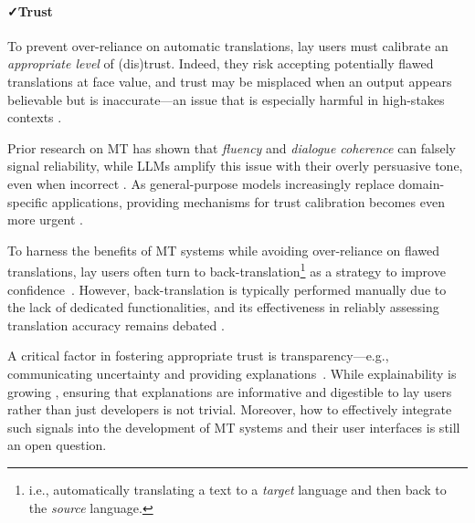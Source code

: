 \paragraph{\faCheck \space Trust} 
To prevent over-reliance on automatic translations, lay users must calibrate an \emph{appropriate level} of (dis)trust. Indeed, they risk accepting potentially flawed translations at face value, and trust may be misplaced when an output appears believable but is inaccurate—an issue that is especially harmful in high-stakes contexts \citep{mehandru-etal-2023-physician}.

Prior research on MT has shown that \textit{fluency} and \textit{dialogue coherence} can falsely signal reliability, while LLMs amplify this issue with their overly persuasive tone, even when incorrect \citep{xiong2024llmsexpressuncertaintyempirical, trust}. As general-purpose models increasingly replace domain-specific applications, providing mechanisms for trust calibration becomes even more urgent \citep{deng2022generalpurposemachinetranslation, litschko-etal-2023-establishing}.

To harness the benefits of MT systems while avoiding over-reliance on flawed translations, lay users often turn to back-translation\footnote{i.e., automatically translating a text to a \emph{target} language and then back to the \emph{source} language.} as a strategy to improve confidence~\citep{back-2007, zouhar-etal-2021-backtranslation, mehandru-etal-2023-physician}. However, back-translation is typically performed manually due to the lack of dedicated functionalities, and its effectiveness in reliably assessing translation accuracy remains debated \citep{robertson2022understanding}.

A critical factor in fostering appropriate trust is transparency—e.g., communicating uncertainty and providing explanations~\citep{liao2023aitransparencyagellms}. While explainability is growing \citep{sarti-bisazza-2022-indee}, ensuring that explanations are informative and digestible to lay users rather than just developers is not trivial. Moreover, how to effectively integrate such signals into the development of MT systems and their user interfaces is still an open question.






